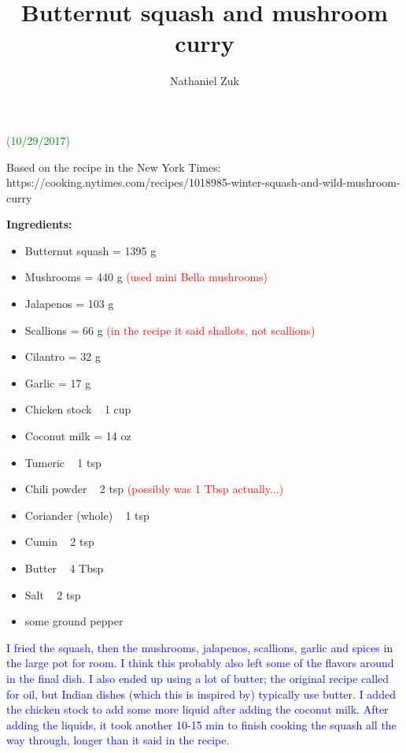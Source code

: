 \usepackage{parskip}
\usepackage{color}

\title{Butternut squash and mushroom curry}
\author{Nathaniel Zuk}


\maketitle

\textcolor{green}{(10/29/2017)}

Based on the recipe in the New York Times: https://cooking.nytimes.com/recipes/1018985-winter-squash-and-wild-mushroom-curry

\textbf{Ingredients:}

\begin{itemize}
\item Butternut squash = 1395 g
\item Mushrooms = 440 g \textcolor{red}{(used mini Bella mushrooms)}
\item Jalapenos = 103 g
\item Scallions = 66 g \textcolor{red}{(in the recipe it said shallots, not scallions)}
\item Cilantro = 32 g
\item Garlic = 17 g
\item Chicken stock ~ 1 cup
\item Coconut milk = 14 oz
\item Tumeric ~ 1 tsp
\item Chili powder ~ 2 tsp \textcolor{red}{(possibly was 1 Tbsp actually...)}
\item Coriander (whole) ~ 1 tsp
\item Cumin ~ 2 tsp
\item Butter ~ 4 Tbsp
\item Salt ~ 2 tsp
\item some ground pepper
\end{itemize}

\textcolor{blue}{I fried the squash, then the mushrooms, jalapenos, scallions, garlic and spices in the large pot for room.  I think this probably also left some of the flavors around in the final dish.  I also ended up using a lot of butter; the original recipe called for oil, but Indian dishes (which this is inspired by) typically use butter. I added the chicken stock to add some more liquid after adding the coconut milk.  After adding the liquids, it took another 10-15 min to finish cooking the squash all the way through, longer than it said in the recipe.}

